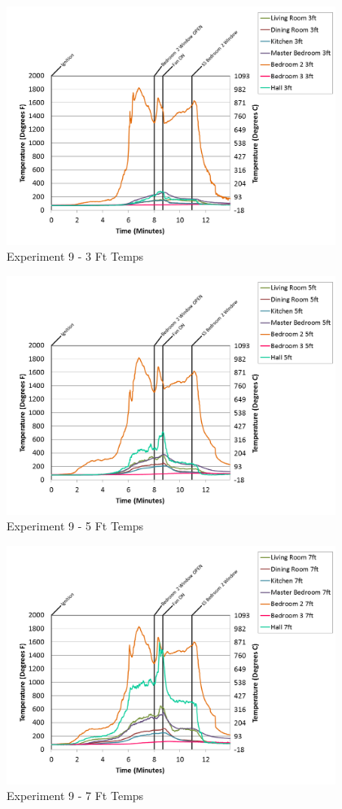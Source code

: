\documentclass{article}
\begin{document}
\begin{appendices}
\begin{figure}[h!]
	\centering
	\includegraphics[height=3.05in]{0_Images/Results_Charts/Exp_9_Charts/3FtTemps.png}
	\caption{Experiment 9 - 3 Ft Temps}
\end{figure}

\clearpage

\begin{figure}[h!]
	\centering
	\includegraphics[height=3.05in]{0_Images/Results_Charts/Exp_9_Charts/5FtTemps.png}
	\caption{Experiment 9 - 5 Ft Temps}
\end{figure}


\begin{figure}[h!]
	\centering
	\includegraphics[height=3.05in]{0_Images/Results_Charts/Exp_9_Charts/7FtTemps.png}
	\caption{Experiment 9 - 7 Ft Temps}
\end{figure}


\end{appendices}
\end{document}
